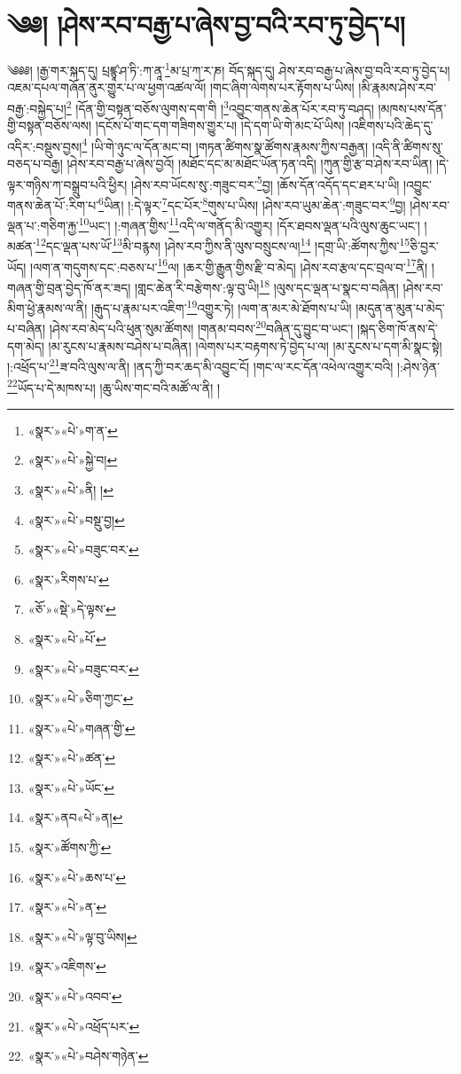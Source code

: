 \chapter{༄༅། །ཤེས་རབ་བརྒྱ་པ་ཞེས་བྱ་བའི་རབ་ཏུ་བྱེད་པ།}༄༅༅། །རྒྱ་གར་སྐད་དུ། པྲཛྙཱ་ཤ་ཏི་:ཀ་ནཱ་\footnote{«སྣར་»«པེ་»ག་ན་}མ་པྲ་ཀ་ར་ཎ། བོད་སྐད་དུ། ཤེས་རབ་བརྒྱ་པ་ཞེས་བྱ་བའི་རབ་ཏུ་བྱེད་པ། འཇམ་དཔལ་གཞོན་ནུར་གྱུར་པ་ལ་ཕྱག་འཚལ་ལོ། །གང་ཞིག་ལེགས་པར་རྟོགས་པ་ཡིས། །མི་རྣམས་ཤེས་རབ་བརྒྱ་:བསྐྱེད་པ།\footnote{«སྣར་»«པེ་»སྐྱེ་བ།} །དོན་གྱི་བསྟན་བཅོས་ལུགས་དག་གི །\footnote{«སྣར་»«པེ་»ནི། །}འབྱུང་གནས་ཆེན་པོར་རབ་ཏུ་བཤད། །མཁས་པས་དོན་གྱི་བསྟན་བཅོས་ལས། །དངོས་པོ་གང་དག་གཟིགས་གྱུར་པ། །དེ་དག་ཡི་གེ་མང་པོ་ཡིས། །འཇིགས་པའི་ཆེད་དུ་འདིར་:བསྡུས་བྱས།\footnote{«སྣར་»«པེ་»བསྡུ་བྱ།} །ཡི་གེ་ཉུང་ལ་དོན་མང་བ། །གཏན་ཚིགས་སྣ་ཚོགས་རྣམས་ཀྱིས་བརྒྱན། །འདི་ནི་ཚིགས་སུ་བཅད་པ་བརྒྱ། །ཤེས་རབ་བརྒྱ་པ་ཞེས་བྱའོ། །མཐོང་དང་མ་མཐོང་ཡོན་ཏན་འདི། །ཀུན་གྱི་རྩ་བ་ཤེས་རབ་ཡིན། །དེ་ལྟར་གཉིས་ཀ་བསྒྲུབ་པའི་ཕྱིར། །ཤེས་རབ་ཡོངས་སུ་:གཟུང་བར་\footnote{«སྣར་»«པེ་»བཟུང་བར་}བྱ། །ཆོས་དོན་འདོད་དང་ཐར་པ་ཡི། །འབྱུང་གནས་ཆེན་པོ་:རིག་པ་\footnote{«སྣར་»རིགས་པ་}ཡིན། །:དེ་ལྟར་\footnote{«ཅོ་»«སྡེ་»དེ་ལྟས་}དང་པོར་\footnote{«སྣར་»«པེ་»པོ་}གུས་པ་ཡིས། །ཤེས་རབ་ཡུམ་ཆེན་:གཟུང་བར་\footnote{«སྣར་»«པེ་»བཟུང་བར་}བྱ། །ཤེས་རབ་ལྡན་པ་:གཅིག་རྐྱ་\footnote{«སྣར་»«པེ་»ཅིག་ཀྱང་}ཡང་། །:གཞན་གྱིས་\footnote{«སྣར་»«པེ་»གཞན་གྱི་}འདི་ལ་གནོད་མི་འགྱུར། །དོར་ཐབས་ལྡན་པའི་ལུས་ཆུང་ཡང་། །མཚན་\footnote{«སྣར་»«པེ་»ཚན་}དང་ལྡན་པས་ཡོ་\footnote{«སྣར་»«པེ་»ཡོང་}མི་བརྙས། །ཤེས་རབ་ཀྱིས་ནི་ལུས་བསྲུངས་ལ།\footnote{«སྣར་»ནབ«པེ་»ན།} །དགྲ་ཡི་:ཚོགས་ཀྱིས་\footnote{«སྣར་»ཚོགས་ཀྱི་}ཅི་བྱར་ཡོད། །ལག་ན་གདུགས་དང་:བཅས་པ་\footnote{«སྣར་»«པེ་»ཆས་པ་}ལ། །ཆར་གྱི་རྒྱུན་གྱིས་རྫི་བ་མེད། །ཤེས་རབ་རྩལ་དང་བྲལ་བ་\footnote{«སྣར་»«པེ་»ན་}ནི། །གཞན་གྱི་བྲན་བྱེད་ཁོ་ནར་ཟད། །གླང་ཆེན་རི་བརྩེགས་:ལྟ་བུ་ཡི།\footnote{«སྣར་»«པེ་»ལྟ་བུ་ཡིས།} །ལུས་དང་ལྡན་པ་སྣང་བ་བཞིན། །ཤེས་རབ་མིག་ཕྱེ་རྣམས་ལ་ནི། །རྒུད་པ་རྣམ་པར་འཇིག་\footnote{«སྣར་»འཇིགས་}འགྱུར་ཏེ། །ལག་ན་མར་མེ་ཐོགས་པ་ཡི། །མདུན་ན་མུན་པ་མེད་པ་བཞིན། །ཤེས་རབ་མེད་པའི་ཕུན་སུམ་ཚོགས། །གནམ་བབས་\footnote{«སྣར་»«པེ་»འབབ་}བཞིན་དུ་བྱུང་བ་ཡང་། །སྐད་ཅིག་ཁོ་ནས་དེ་དག་མེད། །མ་རུངས་པ་རྣམས་བཤེས་པ་བཞིན། །ལེགས་པར་བརྟགས་ཏེ་བྱེད་པ་ལ། །མ་རུངས་པ་དག་མི་སྣང་སྟེ། །:འཕྲོད་པ་\footnote{«སྣར་»«པེ་»འཕྲོད་པར་}ཟ་བའི་ལུས་ལ་ནི། །ནད་ཀྱི་བར་ཆད་མི་འབྱུང་ངོ། །གང་ལ་རང་དོན་འཕེལ་འགྱུར་བའི། །:ཤེས་ཉེན་\footnote{«སྣར་»«པེ་»བཤེས་གཉེན་}ཡོད་པ་དེ་མཁས་པ། །ཆུ་ཡིས་གང་བའི་མཚོ་ལ་ནི། །
